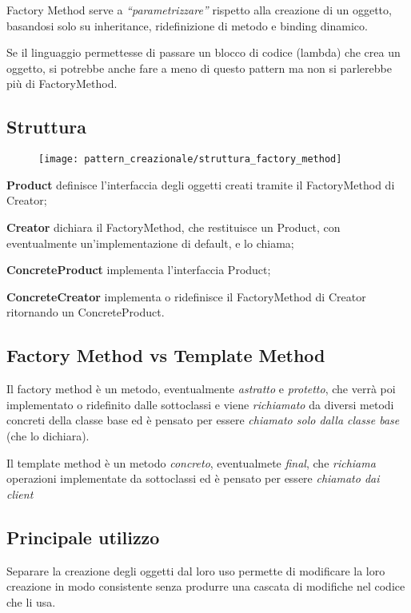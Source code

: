 Factory Method serve a \textit{“parametrizzare”} rispetto alla creazione di un oggetto, basandosi solo su inheritance, ridefinizione di metodo e binding dinamico.

Se il linguaggio permettesse di passare un blocco di codice (lambda) che crea un oggetto, si potrebbe anche fare a meno di questo pattern ma non si parlerebbe più
di FactoryMethod.

\subsection{Struttura}
\begin{figure}[H]
    \centering
    \texttt{[image: pattern\_creazionale/struttura\_factory\_method]}
\end{figure}

\textbf{Product} definisce l'interfaccia degli oggetti creati tramite il FactoryMethod di Creator;

\textbf{Creator} dichiara il FactoryMethod, che restituisce un Product, con eventualmente un'implementazione di default, e lo chiama;

\textbf{ConcreteProduct} implementa l'interfaccia Product;

\textbf{ConcreteCreator} implementa o ridefinisce il FactoryMethod di Creator ritornando un ConcreteProduct.

\subsection{Factory Method vs Template Method}

Il factory method è un metodo, eventualmente \textit{astratto} e \textit{protetto}, che verrà poi implementato o ridefinito dalle sottoclassi e viene 
\textit{richiamato} da diversi metodi concreti della classe base ed è pensato per essere \textit{chiamato solo dalla classe base} (che lo dichiara).
\smallskip

Il template method è un metodo \textit{concreto}, eventualmete \textit{final}, che \textit{richiama} operazioni implementate da sottoclassi ed è pensato 
per essere \textit{chiamato dai client}

\subsection{Principale utilizzo}

Separare la creazione degli oggetti dal loro uso permette di modificare la loro creazione in modo consistente senza produrre una cascata di modifiche nel codice che 
li usa.

